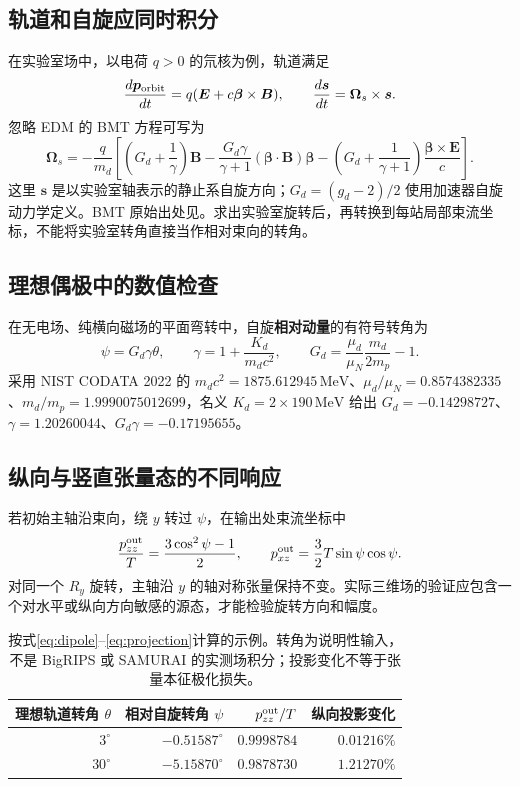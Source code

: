 \documentclass[UTF8,11pt,a4paper,fontset=none]{ctexart}
\newcommand{\unit}[1]{\,\mathrm{#1}}
\begin{document}
\subsection{轨道和自旋应同时积分}
在实验室场中，以电荷 $q>0$ 的氘核为例，轨道满足
\begin{equation}
\frac{d\bm p_{\rm orbit}}{dt}=q(\bm E+c\bm\beta\times\bm B),\qquad
\frac{d\bm s}{dt}=\bm\Omega_s\times\bm s.
\end{equation}
忽略 EDM 的 BMT 方程可写为
\begin{equation}
\bm\Omega_s=-\frac q{m_d}\left[
\left(G_d+\frac1\gamma\right)\bm B
-\frac{G_d\gamma}{\gamma+1}(\bm\beta\cdot\bm B)\bm\beta
-\left(G_d+\frac1{\gamma+1}\right)\frac{\bm\beta\times\bm E}{c}
\right].\label{eq:bmt}
\end{equation}
这里 $\bm s$ 是以实验室轴表示的静止系自旋方向；$G_d=(g_d-2)/2$ 使用加速器自旋动力学定义。BMT 原始出处见\cite{BMT1959}。求出实验室旋转后，再转换到每站局部束流坐标，不能将实验室转角直接当作相对束向的转角。

\subsection{理想偶极中的数值检查}
在无电场、纯横向磁场的平面弯转中，自旋\textbf{相对动量}的有符号转角为
\begin{equation}
\psi=G_d\gamma\theta,\qquad
\gamma=1+\frac{K_d}{m_dc^2},\qquad
G_d=\frac{\mu_d}{\mu_N}\frac{m_d}{2m_p}-1.\label{eq:dipole}
\end{equation}
采用 NIST CODATA 2022 的 $m_dc^2=1875.612945\unit{MeV}$、$\mu_d/\mu_N=0.8574382335$、$m_d/m_p=1.9990075012699$，名义 $K_d=2\times190\unit{MeV}$ 给出 $G_d=-0.14298727$、$\gamma=1.20260044$、$G_d\gamma=-0.17195655$。\cite{CODATA2022}

\clearpage
\subsection{纵向与竖直张量态的不同响应}
若初始主轴沿束向，绕 $y$ 转过 $\psi$，在输出处束流坐标中
\begin{equation}
\frac{p_{zz}^{\rm out}}{T}=\frac{3\cos^2\psi-1}{2},\qquad
p_{xz}^{\rm out}=\frac32T\sin\psi\cos\psi.\label{eq:projection}
\end{equation}
对同一个 $R_y$ 旋转，主轴沿 $y$ 的轴对称张量保持不变。实际三维场的验证应包含一个对水平或纵向方向敏感的源态，才能检验旋转方向和幅度。

\begin{table}[H]\centering
\begin{tabular}{rrrr}\toprule
理想轨道转角 $\theta$ & 相对自旋转角 $\psi$ & $p_{zz}^{\rm out}/T$ & 纵向投影变化 \\\midrule
$3^\circ$ & $-0.51587^\circ$ & $0.9998784$ & $0.01216\%$ \\
$30^\circ$ & $-5.15870^\circ$ & $0.9878730$ & $1.21270\%$ \\\bottomrule
\end{tabular}
\caption{按式\eqref{eq:dipole}--\eqref{eq:projection}计算的示例。转角为说明性输入，不是 BigRIPS 或 SAMURAI 的实测场积分；投影变化不等于张量本征极化损失。}
\end{table}
\end{document}

